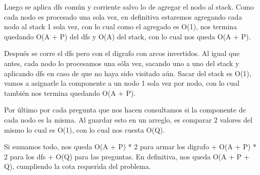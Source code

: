 Luego se aplica dfs común y corriente salvo lo de agregar el nodo al stack. Como cada nodo es procesado una sola vez, en definitiva estaremos agregando cada nodo al stack 1 sola vez, con lo cual como el agregado es O(1), nos termina quedando O(A + P) del dfs y O(A) del stack, con lo cual nos queda O(A + P).\newline

Después se corre el dfs pero con el digrafo con arcos invertidos. Al igual que antes, cada nodo lo procesamos una sóla vez, sacando uno a uno del stack y aplicando dfs en caso de que no haya sido visitado aún. Sacar del stack es O(1), vamos a asignarle la componente a un nodo 1 sola vez por nodo, con lo cual también nos termina quedando O(A + P).\newline

Por último por cada pregunta que nos hacen consultamos si la componente de cada nodo es la misma. Al guardar esto en un arreglo, es comparar 2 valores del mismo lo cual es O(1), con lo cual nos cuesta O(Q).\newline

Si sumamos todo, nos queda O(A + P) * 2 para armar los digrafo + O(A + P) * 2 para los dfs + O(Q) para las preguntas. En definitiva, nos queda O(A + P + Q), cumpliendo la cota requerida del problema.\newline